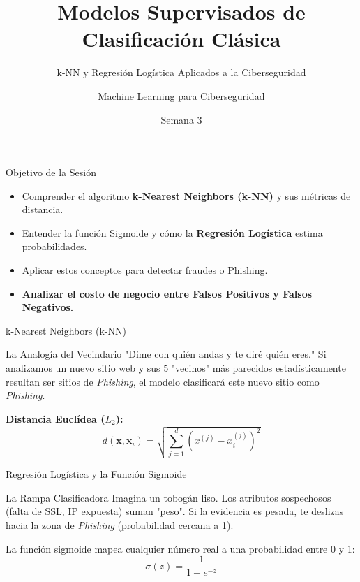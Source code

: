 \documentclass[aspectratio=169]{beamer}
\title{Modelos Supervisados de Clasificación Clásica}
\subtitle{k-NN y Regresión Logística Aplicados a la Ciberseguridad}
\author{Machine Learning para Ciberseguridad}
\date{Semana 3}
\begin{document}
\begin{frame}
    \titlepage
\end{frame}

\begin{frame}{Objetivo de la Sesión}
    \begin{itemize}
        \item Comprender el algoritmo \textbf{k-Nearest Neighbors (k-NN)} y sus métricas de distancia.
        \item Entender la función Sigmoide y cómo la \textbf{Regresión Logística} estima probabilidades.
        \item Aplicar estos conceptos para detectar fraudes o Phishing.
        \item \textcolor{VerdeAzulado}{\textbf{Analizar el costo de negocio entre Falsos Positivos y Falsos Negativos.}}
    \end{itemize}
\end{frame}

\begin{frame}{k-Nearest Neighbors (k-NN)}
    \begin{block}{La Analogía del Vecindario}
        "Dime con quién andas y te diré quién eres."
        Si analizamos un nuevo sitio web y sus 5 "vecinos" más parecidos estadísticamente resultan ser sitios de \textit{Phishing}, el modelo clasificará este nuevo sitio como \textit{Phishing}.
    \end{block}
    
    \textbf{Distancia Euclídea ($L_2$):}
    $$d(\mathbf{x}, \mathbf{x}_i) = \sqrt{\sum_{j=1}^{d} (x^{(j)} - x_i^{(j)})^2}$$
\end{frame}

\begin{frame}{Regresión Logística y la Función Sigmoide}
    \begin{alertblock}{La Rampa Clasificadora}
        Imagina un tobogán liso. Los atributos sospechosos (falta de SSL, IP expuesta) suman "peso". Si la evidencia es pesada, te deslizas hacia la zona de \textit{Phishing} (probabilidad cercana a 1).
    \end{alertblock}
    
    La función sigmoide mapea cualquier número real a una probabilidad entre 0 y 1:
    $$\sigma(z) = \frac{1}{1 + e^{-z}}$$
\end{frame}
\end{document}

